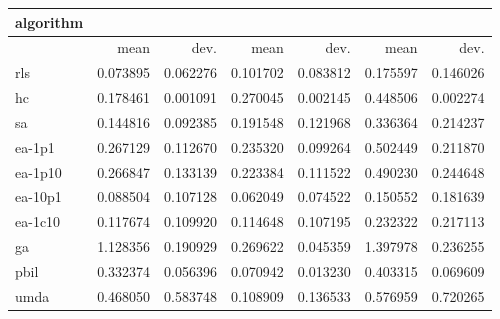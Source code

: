 \begin{tabular}{@{}l*{6}{>{{}}N{1}{2}}@{}}
\toprule
{algorithm} &  &  &  \\
\midrule
& {mean} & {dev.} & {mean} & {dev.} & {mean} & {dev.} \\
\midrule
rls & 0.073895 & 0.062276 & 0.101702 & 0.083812 & 0.175597 & 0.146026 \\
 hc & 0.178461 & 0.001091 & 0.270045 & 0.002145 & 0.448506 & 0.002274 \\
 sa & 0.144816 & 0.092385 & 0.191548 & 0.121968 & 0.336364 & 0.214237 \\
 ea-1p1 & 0.267129 & 0.112670 & 0.235320 & 0.099264 & 0.502449 & 0.211870 \\
 ea-1p10 & 0.266847 & 0.133139 & 0.223384 & 0.111522 & 0.490230 & 0.244648 \\
 ea-10p1 & 0.088504 & 0.107128 & 0.062049 & 0.074522 & 0.150552 & 0.181639 \\
 ea-1c10 & 0.117674 & 0.109920 & 0.114648 & 0.107195 & 0.232322 & 0.217113 \\
 ga & 1.128356 & 0.190929 & 0.269622 & 0.045359 & 1.397978 & 0.236255 \\
 pbil & 0.332374 & 0.056396 & 0.070942 & 0.013230 & 0.403315 & 0.069609 \\
 umda & 0.468050 & 0.583748 & 0.108909 & 0.136533 & 0.576959 & 0.720265 \\
 \bottomrule
\end{tabular}
